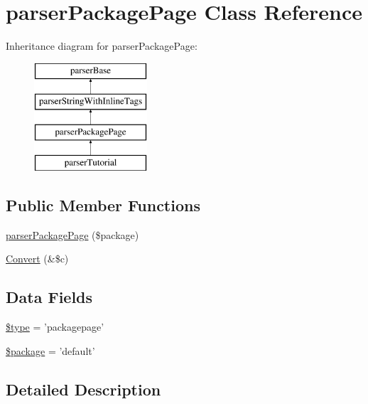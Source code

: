 \hypertarget{classparser_package_page}{\section{parser\-Package\-Page \-Class \-Reference}
\label{classparser_package_page}
}
\-Inheritance diagram for parser\-Package\-Page\-:\begin{figure}[H]
\begin{center}
\leavevmode
\includegraphics[height=4.000000cm]{classparser_package_page}
\end{center}
\end{figure}
\subsection*{\-Public \-Member \-Functions}
\begin{DoxyCompactItemize}
\item 
\hyperlink{classparser_package_page_acb403913830ba0a28fd3ed4e9536f382}{parser\-Package\-Page} (\$package)
\item 
\hyperlink{classparser_package_page_ad6c06bea9d11cc1c362b592306cfa707}{\-Convert} (\&\$c)
\end{DoxyCompactItemize}
\subsection*{\-Data \-Fields}
\begin{DoxyCompactItemize}
\item 
\hyperlink{classparser_package_page_a9a4a6fba2208984cabb3afacadf33919}{\$type} = 'packagepage'
\item 
\hyperlink{classparser_package_page_a365395516cc195292e97e09bc0d165ae}{\$package} = 'default'
\end{DoxyCompactItemize}


\subsection{\-Detailed \-Description}


